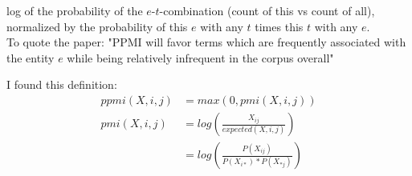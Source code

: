 \noindent log of the probability of the $e$-$t$-combination (count of this vs count of all), normalized by the probability of this $e$ with any $t$ times this $t$ with any $e$.\\
To quote the paper: "PPMI will favor terms which are frequently associated with the entity $e$ while being relatively infrequent in the corpus overall"

\vspace{30px}

I found this definition:
\begin{align*}
ppmi(X,i,j) &= max(0, pmi(X,i,j)) \\
pmi(X,i,j)  &= log\left( \frac{X_{ij}}{expected(X,i,j)} \right) \\
            &= log\left( \frac{P(X_{ij})}{P(X_{i*}) * P(X_{*j})} \right)
\end{align*}




